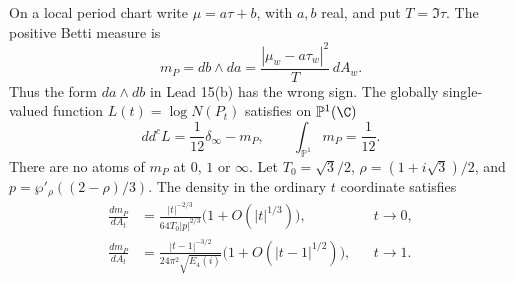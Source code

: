 \begin{statement}
On a local period chart write $\mu=a\tau+b$, with $a,b$ real,
and put $T=\Im\tau$. The positive Betti measure is
\[
 m_P=db\wedge da
 =\frac{|\mu_w-a\tau_w|^2}{T}\,dA_w.
\]
Thus the form $da\wedge db$ in Lead 15(b) has the wrong sign.
The globally single-valued function $L(t)=\log N(P_t)$ satisfies
on $\mathbb P^1(\C)$
\begin{equation}\label{eq:ca-current}
 dd^cL=\frac1{12}\delta_\infty-m_P,\qquad
               \int_{\mathbb P^1}m_P=\frac1{12}.
\end{equation}
There are no atoms of $m_P$ at $0$, $1$ or $\infty$.
Let $T_0=\sqrt3/2$, $\rho=(1+i\sqrt3)/2$, and
$p=\wp'_\rho((2-\rho)/3)$. The density in the ordinary
$t$ coordinate satisfies
\begin{align}
 \frac{dm_P}{dA_t}
 &=\frac{|t|^{-2/3}}{64T_0|p|^{2/3}}
                      \bigl(1+O(|t|^{1/3})\bigr),
                         &&t\longrightarrow0,\label{eq:ca-density0}\\
 \frac{dm_P}{dA_t}
 &=\frac{|t-1|^{-3/2}}{24\pi^2\sqrt{E_4(i)}}
                      \bigl(1+O(|t-1|^{1/2})\bigr),
                         &&t\longrightarrow1.\label{eq:ca-density1}
\end{align}
\end{statement}
